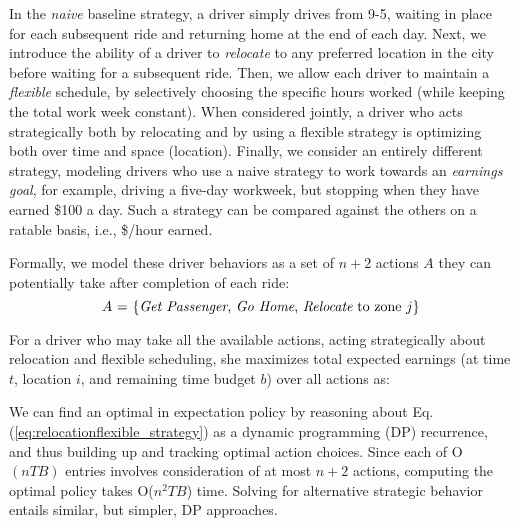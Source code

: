 {In the {\em naive} baseline strategy, a driver simply drives from 9-5, 
waiting in place for each subsequent ride and returning home at the end of each day.  Next, 
we introduce the ability of a driver to {\em relocate} to any preferred location in the
city before waiting for a subsequent ride.  Then, we allow each driver to maintain a
{\em flexible} schedule, by selectively choosing the specific hours worked (while
keeping the total work week constant).  When considered jointly, a driver who acts
strategically both by relocating and by using a flexible strategy is optimizing both
over time and space (location).  Finally, we consider an entirely different strategy,
modeling drivers who use a naive strategy to work towards an {\em earnings goal}, for
example, driving a five-day workweek, but stopping when they have earned \$100 a day.  Such a
strategy can be compared against the others on a ratable basis, i.e., \$/hour earned.

Formally, we model these driver behaviors as a set of $n+2$ actions $A$ they can potentially
take after completion of each ride: 
\begin{equation}
\mbox{
$A$ = \{{{\it Get Passenger}}, {{\it Go Home}}, {{\it Relocate}} to zone $j$\}
}
\end{equation}

For a driver who may take all the available actions,
acting strategically about relocation and flexible scheduling, she maximizes total expected 
earnings (at time $t$, location $i$, and remaining time budget $b$) over all actions as:


We can find an optimal in expectation policy by reasoning about Eq.(\ref{eq:relocationflexible_strategy}) as a dynamic programming (DP)
recurrence, and thus building up and tracking optimal action choices.  Since each of O$(n T B)$ entries involves consideration of at most
$n+2$ actions, computing the optimal policy takes O($n^2 T B$) time.  Solving for alternative strategic behavior entails similar, but 
simpler, DP approaches.
\fi

}
